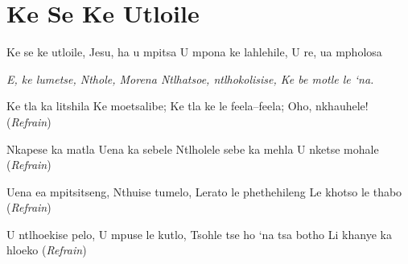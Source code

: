 \starttocol
\chapter{Ke Se Ke Utloile}
\nexttocol
\hfill{\it }
\stoptocol
\starttocol
\startlines
{\sc Ke} se ke utloile,
Jesu, ha u mpitsa
U mpona ke lahlehile,
U re, ua mpholosa

{\it E, ke lumetse,
Nthole, Morena
Ntlhatsoe, ntlhokolisise,
Ke be motle le `na.}

Ke tla ka litshila
Ke moetsalibe;
Ke tla ke le feela--feela;
Oho, nkhauhele!         \hfill({\it Refrain})~~~~~~~~~

Nkapese ka matla
Uena ka sebele
Ntlholele sebe ka mehla
U nketse mohale          \hfill({\it Refrain})~~~~~~~~~

Uena ea mpitsitseng,
Nthuise tumelo,
Lerato le phethehileng
Le khotso le thabo	         \hfill({\it Refrain})~~~~~~~~~

U ntlhoekise pelo,
U mpuse le kutlo,
Tsohle tse ho `na tsa botho
Li khanye ka hloeko          \hfill({\it Refrain})~~~~~~~~~
\stoplines
\nexttocol

\stoptocol
